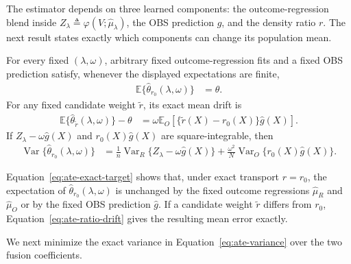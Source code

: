 The estimator depends on three learned components: the outcome-regression blend inside $Z_\lambda \triangleq \varphi(V;\widehat{\mu}_{\lambda})$, the OBS prediction $\widehat{g}$, and the density ratio $r$. The next result states exactly which components can change its population mean.

\begin{theorem}
\label{prop:ate-nuisance-sensitivity}
	\label{thm:ate-variance}
	\label{thm:ate-exact-r}
	For every fixed $(\lambda,\omega)$, arbitrary fixed outcome-regression fits
	and a fixed OBS prediction satisfy, whenever the displayed expectations are
	finite,
	\begin{align}
		\mathbb E\{\widehat\theta_{r_0}(\lambda,\omega)\} &=\theta.
		\label{eq:ate-exact-target}
	\end{align}
	For any fixed candidate weight $\widetilde r$, its exact mean drift is
	\begin{align}
		\mathbb E\{\widehat\theta_{\widetilde r}(\lambda,\omega)\}-\theta
		&=\omega\mathbb E_O\left[\{\widetilde r(X)-r_0(X)\}\widehat{g}(X)\right].
		\label{eq:ate-ratio-drift}
	\end{align}
	If $Z_\lambda-\omega\widehat{g}(X)$ and
	$r_0(X)\widehat{g}(X)$ are square-integrable, then
	\begin{align}
		\operatorname{Var}\{\widehat\theta_{r_0}(\lambda,\omega)\}
		&=
		\frac1n\operatorname{Var}_R\{Z_\lambda-\omega \widehat{g}(X)\}
		+
		\frac{\omega^2}{N}\operatorname{Var}_O\{r_0(X)\widehat{g}(X)\}.
		\label{eq:ate-variance}
	\end{align}
\end{theorem}
Equation~\eqref{eq:ate-exact-target} shows that, under exact transport
$r=r_0$, the expectation of $\widehat\theta_{r_0}(\lambda,\omega)$ is
unchanged by the fixed outcome regressions $\widehat\mu_R$ and
$\widehat\mu_O$ or by the fixed OBS prediction $\widehat{g}$. If a candidate
weight $\widetilde r$ differs from $r_0$, Equation~\eqref{eq:ate-ratio-drift}
gives the resulting mean error exactly.

We next minimize the exact variance in Equation~\eqref{eq:ate-variance} over the two fusion coefficients.

